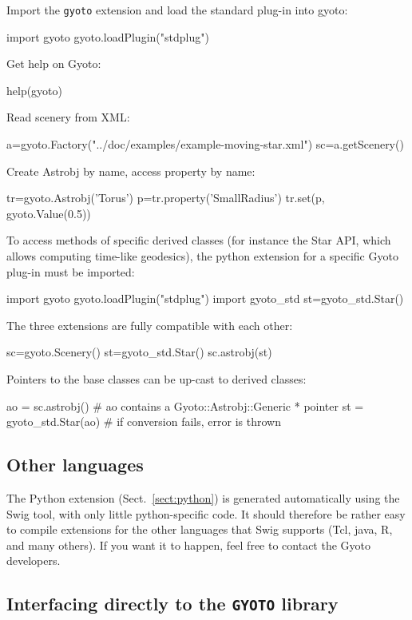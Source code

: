 \documentclass[a4paper,12pt]{article}
\begin{document}
Import the \texttt{gyoto} extension and load the standard plug-in into
gyoto:
\begin{code}
  import gyoto
  gyoto.loadPlugin("stdplug")
\end{code}
Get help on Gyoto:
\begin{code}
  help(gyoto)
\end{code}
Read scenery from XML:
\begin{code}
  a=gyoto.Factory("../doc/examples/example-moving-star.xml")
  sc=a.getScenery()
\end{code}
Create Astrobj by name, access property by name:
\begin{code}
  tr=gyoto.Astrobj('Torus')
  p=tr.property('SmallRadius')
  tr.set(p, gyoto.Value(0.5))
\end{code}

To access methods of specific derived classes (for instance the Star
API, which allows computing time-like geodesics), the python extension
for a specific Gyoto plug-in must be imported:
\begin{code}
  import gyoto
  gyoto.loadPlugin("stdplug")
  import gyoto_std
  st=gyoto_std.Star()
\end{code}
The three extensions are fully compatible with each other:
\begin{code}
  sc=gyoto.Scenery()
  st=gyoto_std.Star()
  sc.astrobj(st)
\end{code}
Pointers to the base classes can be up-cast to derived classes:
\begin{code}
  ao = sc.astrobj() # ao contains a Gyoto::Astrobj::Generic * pointer
  st = gyoto_std.Star(ao) # if conversion fails, error is thrown
\end{code}


\subsection{Other languages}
\label{sect:swig}

The Python extension (Sect.~\ref{sect:python}) is generated
automatically using the Swig tool, with only little python-specific
code. It should therefore be rather easy to compile extensions for the
other languages that Swig supports (Tcl, java, R, and many others). If
you want it to happen, feel free to contact the Gyoto developers.

\subsection{Interfacing directly to the \texttt{GYOTO} library}
\end{document}
